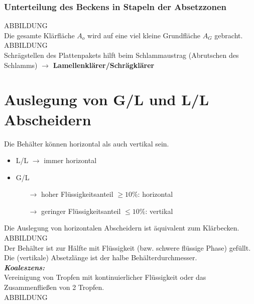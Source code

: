 \subsubsection{Unterteilung des Beckens in Stapeln der Absetzzonen}

ABBILDUNG\\

Die gesamte Klärfläche $A_o$ wird auf eine viel kleine Grundfläche $A_G$ gebracht.\\

ABBILDUNG\\

Schrägstellen des Plattenpakets hilft beim Schlammaustrag \linebreak
(Abrutschen des Schlamms) $\rightarrow$ \textbf{Lamellenklärer/Schrägklärer}

\section{Auslegung von G/L und L/L Abscheidern}

Die Behälter können horizontal als auch vertikal sein.
\begin{itemize}
	\item L/L $\rightarrow$ immer horizontal
	\item G/L 
		\begin{itemize}
			\item [$\rightarrow$] hoher Flüssigkeitsanteil $\geq 10\%$: horizontal
			\item [$\rightarrow$] geringer Flüssigkeitsanteil $\leq 10\%$: vertikal
		\end{itemize}
\end{itemize}

Die Auslegung von horizontalen Abscheidern ist äquivalent zum Klärbecken.\\

ABBILDUNG\\

Der Behälter ist zur Hälfte mit Flüssigkeit (bzw. schwere flüssige Phase) gefüllt. \\
Die (vertikale) Absetzlänge ist der halbe Behälterdurchmesser.\\

\textbf{\textit{Koaleszens:}}\\
Vereinigung von Tropfen mit kontinuierlicher Flüssigkeit oder das Zusammenfließen von 2 Tropfen.\\

ABBILDUNG\\

